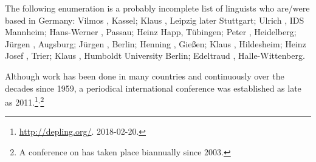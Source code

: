 The following enumeration is a probably incomplete list of linguists who are/were based in Germany: 
Vilmos \citet{Agel2000a-u}, Kassel; 
Klaus \citet{Baumgaertner65a-u,Baumgaertner70a}, Leipzig later Stuttgart;
Ulrich \citet{Engel77,Engel2014a}, IDS Mannheim; 
Hans-Werner \citet{Eroms85a,Eroms87b-u,Eroms2000a}, Passau; 
Heinz Happ, Tübingen;
Peter \citet{Hellwig78a-u,Hellwig2003a}, Heidelberg;
Jürgen \citet{Heringer96a-u}, Augsburg; 
Jürgen \citet{Kunze68a-u,Kunze75a-u}, Berlin;
Henning \citet{Lobin93a-u}, Gießen;
Klaus \citet{Schubert87a-u}, Hildesheim;
Heinz Josef \citet{Weber97a}, Trier;
Klaus \citet{Welke88a-u,Welke2011a-u}, Humboldt University Berlin;
Edeltraud \citet{Werner93a-u}, Halle-Wittenberg.\pagebreak


Although work has been done in many countries and continuously over the decades since 1959, a
periodical international conference was established as late as 2011.\footnote{%
  \href{http://depling.org/}{http://depling.org/}. 2018-02-20.
}$^,$\footnote{%
  A conference on \mtt has taken place biannually since 2003.
}

